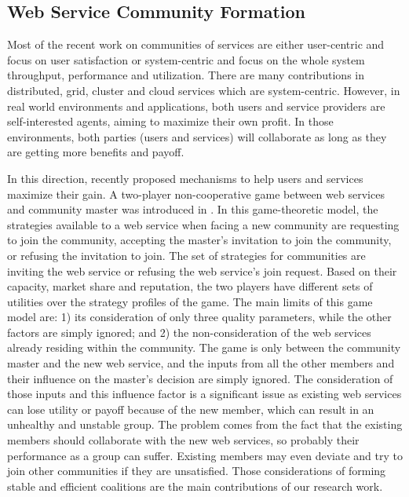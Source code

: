 \subsection{Web Service Community Formation}\label{sec:communities_for_rel}

Most of the recent work on communities of services are either
user-centric and focus on user satisfaction
\cite{Chun02user-centricperformance} or system-centric and focus
on the whole system throughput, performance and utilization. There
are many contributions in distributed, grid, cluster and cloud
services which are system-centric. However, in real world
environments and applications, both users and service providers
are self-interested agents, aiming to maximize their own profit.
In those environments, both parties (users and services) will
collaborate as long as they are getting more benefits and payoff.

In this direction, recently \cite{DBLP:conf/IEEEscc/LimTMB12,
DBLP:conf/IEEEscc/KhosravifarABT11, 10.1109/TSC.2012.12} proposed
mechanisms to help users and services maximize their gain. A
two-player non-cooperative game between web services and community
master was introduced in
\cite{DBLP:conf/IEEEscc/KhosravifarABT11}. In this game-theoretic
model, the strategies available to a web service when facing a new
community are requesting to join the community, accepting the
master's invitation to join the community, or refusing the
invitation to join. The set of strategies for communities are
inviting the web service or refusing the web service's join
request. Based on their capacity, market share and reputation, the
two players have different sets of utilities over the strategy
profiles of the game. The main limits of this game model are: 1)
its consideration of only three quality parameters, while the
other factors are simply ignored; and 2) the non-consideration of
the web services already residing within the community. The game
is only between the community master and the new web service, and
the inputs from all the other members and their influence on the
master's decision are simply ignored. The consideration of those
inputs and this influence factor is a significant issue as
existing web services can lose utility or payoff because of the
new member, which can result in an unhealthy and unstable group.
The problem comes from the fact that the existing members should
collaborate with the new web services, so probably their
performance as a group can suffer. Existing members may even
deviate and try to join other communities if they are unsatisfied.
Those considerations of forming stable and efficient coalitions
are the main contributions of our research work.

